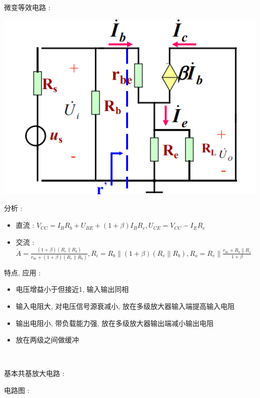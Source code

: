 \documentclass[UTF8, 12pt]{ctexart}
\begin{document}
	微变等效电路 :

	\includegraphics[scale = 0.4]{02/基本共集放大电路微变等效电路.png}

	分析 :
	\begin{itemize}[leftmargin = 4em]
		\item 直流 : $ V_{CC} = I_{B}R_{b} + U_{BE} + (1+\beta)I_{B}R_{e}, U_{CE} = V_{CC} - I_{E}R_{e} $
		\item 交流 : $ \dot{A} = \frac{(1+\beta)(R_{e} \parallel R_{b})}{r_{be} + (1+\beta)(R_{e} \parallel R_{b})}, R_{i} =  R_{b} \parallel (1+\beta)(R_{e} \parallel R_{b}), R_{o} = R_{e} \parallel \frac{r_{be} + R_{b} \parallel R_{s}}{1+\beta} $
	\end{itemize}

	特点, 应用 :
	\begin{itemize}[leftmargin = 4em]
		\item 电压增益小于但接近1, 输入输出同相
		\item 输入电阻大, 对电压信号源衰减小, 放在多级放大器输入端提高输入电阻
		\item 输出电阻小, 带负载能力强, 放在多级放大器输出端减小输出电阻
		\item 放在两级之间做缓冲
	\end{itemize}

	~

	\noindent
	基本共基放大电路 :

	电路图 :
\end{document}
